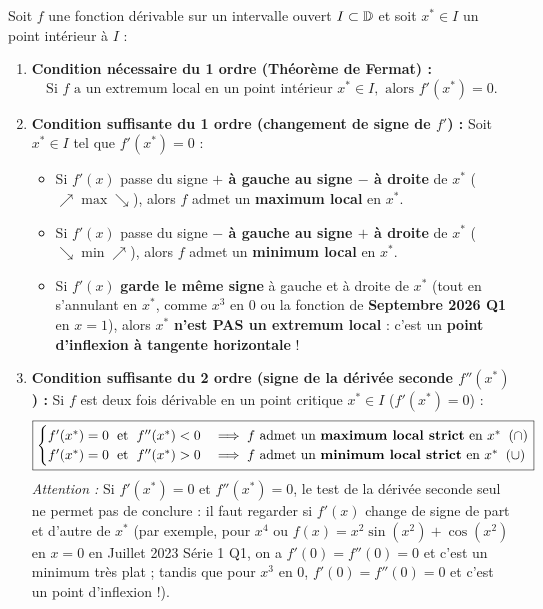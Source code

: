 \begin{theoreme}
Soit $f$ une fonction dérivable sur un intervalle ouvert $I \subset \mathbb{D}$ et soit $x^* \in I$ un point intérieur à $I$ :
\begin{enumerate}
    \item \textbf{Condition nécessaire du 1\ier{} ordre (Théorème de Fermat) :}
    \[
        \boxed{\text{Si } f \text{ a un extremum local en un point intérieur } x^* \in I, \text{ alors } f'(x^*) = 0}.
    \]
    \item \textbf{Condition suffisante du 1\ier{} ordre (changement de signe de $f'$) :} Soit $x^* \in I$ tel que $f'(x^*) = 0$ :
    \begin{itemize}
        \item Si $f'(x)$ passe du signe \textbf{$+$ à gauche au signe $-$ à droite} de $x^*$ ($\nearrow \;\text{max}\; \searrow$), alors $f$ admet un \textbf{maximum local} en $x^*$.
        \item Si $f'(x)$ passe du signe \textbf{$-$ à gauche au signe $+$ à droite} de $x^*$ ($\searrow \;\text{min}\; \nearrow$), alors $f$ admet un \textbf{minimum local} en $x^*$.
        \item Si $f'(x)$ \textbf{garde le même signe} à gauche et à droite de $x^*$ (tout en s'annulant en $x^*$, comme $x^3$ en $0$ ou la fonction de \textbf{Septembre 2026 Q1} en $x = 1$), alors $x^*$ \textbf{n'est PAS un extremum local} : c'est un \textbf{point d'inflexion à tangente horizontale} !
    \end{itemize}
    \item \textbf{Condition suffisante du 2\ieme{} ordre (signe de la dérivée seconde $f''(x^*)$) :} Si $f$ est deux fois dérivable en un point critique $x^* \in I$ ($f'(x^*) = 0$) :
    \[
        \boxed{\begin{cases}
            f'(x^*) = 0 \;\text{ et }\; f''(x^*) < 0 &\implies f \text{ admet un \textbf{maximum local strict} en } x^* \;\; (\cap) \\
            f'(x^*) = 0 \;\text{ et }\; f''(x^*) > 0 &\implies f \text{ admet un \textbf{minimum local strict} en } x^* \;\; (\cup)
        \end{cases}}
    \]
    \emph{Attention :} Si $f'(x^*) = 0$ et $f''(x^*) = 0$, le test de la dérivée seconde seul ne permet pas de conclure : il faut regarder si $f'(x)$ change de signe de part et d'autre de $x^*$ (par exemple, pour $x^4$ ou $f(x) = x^2\sin(x^2)+\cos(x^2)$ en $x=0$ en Juillet 2023 Série 1 Q1, on a $f'(0) = f''(0) = 0$ et c'est un minimum très plat ; tandis que pour $x^3$ en $0$, $f'(0) = f''(0) = 0$ et c'est un point d'inflexion !).
\end{enumerate}
\end{theoreme}

